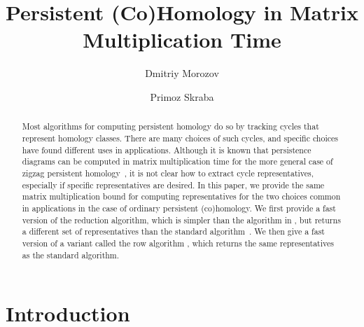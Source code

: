\documentclass{article}
\title{Persistent (Co)Homology in Matrix Multiplication Time}
\author[1]{Dmitriy Morozov}
\author[2]{Primoz Skraba}
\affil[1]{Lawrence Berkeley National Laboratory}
\affil[2]{School of Mathematical Sciences, Queen Mary University of London}
\begin{document}
\maketitle
\begin{abstract}
Most algorithms for computing persistent homology do so by tracking cycles that represent homology classes. There are many choices of such cycles, and
specific choices have found different uses in applications.
Although it is known that persistence diagrams can be computed in matrix multiplication time for the more general case of zigzag persistent homology~\cite{milosavljevic2011zigzag}, it is not clear how to extract cycle representatives, especially if specific representatives are desired.
In this paper, we provide the same matrix multiplication bound for computing representatives for the two choices common in applications in the case of ordinary persistent (co)homology.
We first provide a fast version of the reduction algorithm,  which is simpler than the algorithm in \cite{milosavljevic2011zigzag}, but returns a different set of representatives than the standard algorithm~\cite{edelsbrunner2002topological}.
We then give a fast version of a  variant called the row algorithm \cite{de2011dualities}, which returns the same representatives as the standard algorithm. 
\end{abstract}



\section{Introduction}
\end{document}
